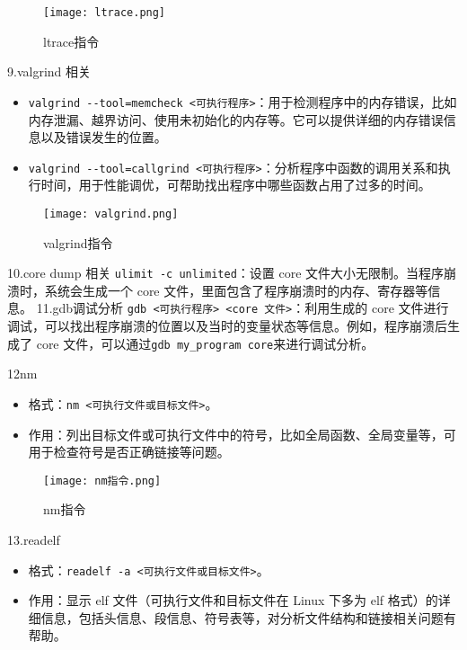 \documentclass{article}
\begin{document}
\begin{figure}[!h]
    \centering
    \texttt{[image: ltrace.png]}
    \caption{ltrace指令}
    \label{fig:enter-label}
\end{figure}
9.valgrind 相关
\begin{itemize}
    \item \verb|valgrind --tool=memcheck <可执行程序>|：用于检测程序中的内存错误，比如内存泄漏、越界访问、使用未初始化的内存等。它可以提供详细的内存错误信息以及错误发生的位置。
    \item \verb|valgrind --tool=callgrind <可执行程序>|：分析程序中函数的调用关系和执行时间，用于性能调优，可帮助找出程序中哪些函数占用了过多的时间。
\end{itemize}
 \begin{figure}[!h]
     \centering
     \texttt{[image: valgrind.png]}
     \caption{valgrind指令}
     \label{fig:enter-label}
 \end{figure}
10.core dump 相关\newline
\verb|ulimit -c unlimited|：设置 core 文件大小无限制。当程序崩溃时，系统会生成一个 core 文件，里面包含了程序崩溃时的内存、寄存器等信息。
\newline
11.gdb调试分析\newline
\verb|gdb <可执行程序> <core 文件>|：利用生成的 core 文件进行调试，可以找出程序崩溃的位置以及当时的变量状态等信息。例如，程序崩溃后生成了 core 文件，可以通过\verb|gdb my_program core|来进行调试分析。
 
12nm
\begin{itemize}
    \item 格式：\verb|nm <可执行文件或目标文件>|。
    \item 作用：列出目标文件或可执行文件中的符号，比如全局函数、全局变量等，可用于检查符号是否正确链接等问题。\newpage
\end{itemize}
 \begin{figure}[!h]
     \centering
     \texttt{[image: nm指令.png]}
     \caption{nm指令}
     \label{fig:enter-label}
 \end{figure}
13.readelf
\begin{itemize}
    \item 格式：\verb|readelf -a <可执行文件或目标文件>|。
    \item 作用：显示 elf 文件（可执行文件和目标文件在 Linux 下多为 elf 格式）的详细信息，包括头信息、段信息、符号表等，对分析文件结构和链接相关问题有帮助。
\end{itemize}
 
\end{document}
